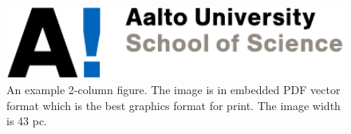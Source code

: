 \documentclass[conference,a4paper]{IEEEtran}
\begin{document}
\begin{figure}[t]
\centering
\includegraphics[width=43pc]{Aalto_EN_SCI_13_RGB_b1.pdf}
\caption{An example 2-column figure. The image is in embedded PDF
  vector format which is the best graphics format for print. The image
  width is 43 pc.}
\label{fig:example-2col}
\end{figure}



\end{document}
